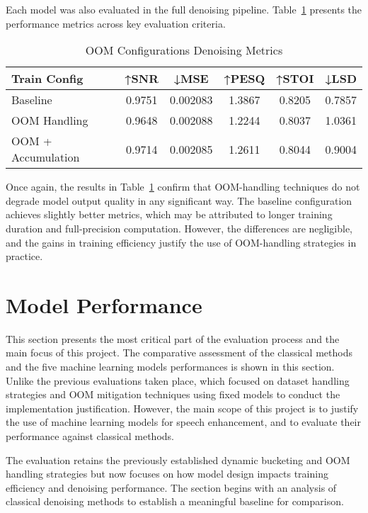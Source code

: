 Each model was also evaluated in the full denoising pipeline. Table~\ref{tab:oom_metrics} presents the performance metrics across key evaluation criteria.

\vspace{1em}
\begin{table}[H]
\centering
\caption{OOM Configurations Denoising Metrics}
\label{tab:oom_metrics}
\begin{tabular}{|l|c|c|c|c|c|}
\hline
\textbf{Train Config} & \textbf{↑SNR} & \textbf{↓MSE} & \textbf{↑PESQ} & \textbf{↑STOI} & \textbf{↓LSD} \\
\hline
Baseline               & 0.9751 & 0.002083 & 1.3867 & 0.8205 & 0.7857 \\
OOM Handling           & 0.9648 & 0.002088 & 1.2244 & 0.8037 & 1.0361 \\
OOM + Accumulation     & 0.9714 & 0.002085 & 1.2611 & 0.8044 & 0.9004 \\
\hline
\end{tabular}
\end{table}

Once again, the results in Table~\ref{tab:oom_metrics} confirm that OOM-handling techniques do not degrade model output quality in any significant way. The baseline configuration achieves slightly better metrics, which may be attributed to longer training duration and full-precision computation. However, the differences are negligible, and the gains in training efficiency justify the use of OOM-handling strategies in practice.


\section{Model Performance}
\label{sec:model_performance}

This section presents the most critical part of the evaluation process and the main focus of this project. The comparative assessment of the classical methods and the five machine learning models performances is shown in this section. Unlike the previous evaluations taken place, which focused on dataset handling strategies and OOM mitigation techniques using fixed models to conduct the implementation justification. However, the main scope of this project is to justify the use of machine learning models for speech enhancement, and to evaluate their performance against classical methods.

The evaluation retains the previously established dynamic bucketing and OOM handling strategies but now focuses on how model design impacts training efficiency and denoising performance. The section begins with an analysis of classical denoising methods to establish a meaningful baseline for comparison.

